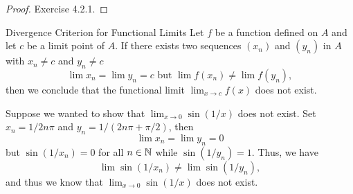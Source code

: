 \begin{proof}
Exercise 4.2.1.
\end{proof}


\begin{cor}{Divergence Criterion for Functional Limits}{}
    Let \( f \) be a function defined on \( A  \) and let \( c  \) be a limit point of \( A  \). If there exists two sequences \( (x_n) \) and \( (y_n) \) in \( A  \) with \( x_n \neq  c \) and \( y_n \neq c  \) 
    \[  \lim x_n = \lim y_n = c \text{~but~} \lim f(x_n) \neq \lim f(y_n),  \]
    then we conclude that the functional limit \( \lim_{x \to c } f(x)  \) does not exist.
    \end{cor}

    \begin{example}{}{}
        Suppose we wanted to show that \( \lim_{ x \to 0 } \sin(1/x) \) does not exist. Set \( x_n = 1/2n\pi \) and \( y_n = 1 / (2n\pi + \pi/2 ) \), then 
        \[  \lim x_n = \lim y_n = 0  \] but
        \( \sin(1/x_n) = 0  \) for all \( n \in \mathbb{N}  \) while \( \sin(1/y_n) = 1  \). Thus, we have 
        \[  \lim \sin(1/x_n) \neq \lim  \sin (1/y_n), \]
        and thus we know that \( \lim_{x \to  0 } \sin(1/x)  \) does not exist.
    \end{example}

